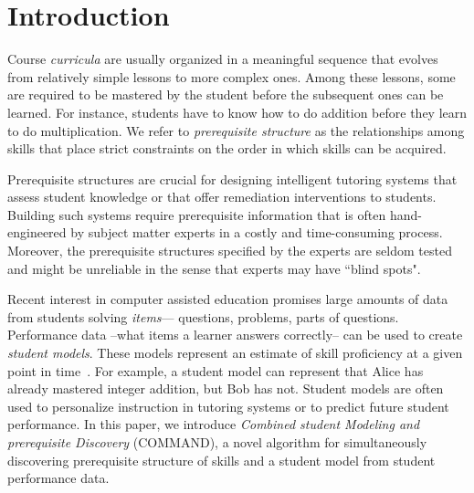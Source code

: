 \documentclass{edm_template}
\begin{document}
\section{Introduction}
\label{sec:introduction}
Course \textit{curricula} are usually organized in a meaningful sequence  that evolves from relatively simple lessons to more complex ones. 
Among these lessons, some are required to be mastered by the student  before the subsequent ones can be learned.
For instance, students have to know how to do addition before they learn to do multiplication.
We refer to \textit{prerequisite structure} as the relationships among skills that place strict constraints on the order in which  skills can be acquired. 

Prerequisite structures are crucial for designing intelligent tutoring systems that assess student knowledge or that offer remediation interventions to students.
Building such systems require prerequisite information that is often hand-engineered by subject matter experts in a costly and time-consuming process. 
Moreover, the prerequisite structures specified by the experts are seldom tested and might be unreliable in the sense that experts may have ``blind spots".


Recent interest in computer assisted education promises large amounts of data from students solving \textit{items}--- questions, problems, parts of questions.
Performance data --what items a learner answers correctly-- can be used to create \textit{student models}. %
These models represent an estimate of skill proficiency  at a given point in time~\cite{vanlehn1988student}.
For example, a student model can represent that Alice has  already mastered integer addition, but Bob has not.
Student models are often used to personalize instruction in tutoring systems or to predict future student performance.
In this paper, we introduce \emph{Combined student Modeling and prerequisite Discovery} (COMMAND), 
a novel algorithm for simultaneously discovering prerequisite structure of skills and a student model from student performance data.
\end{document}
